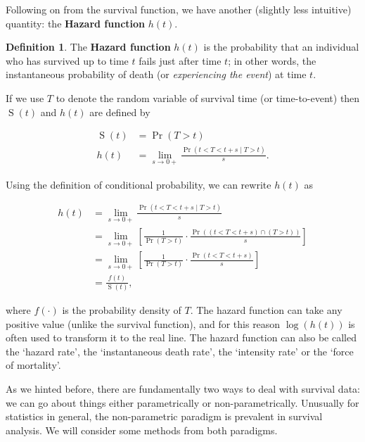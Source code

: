\documentclass[
  openany]{book}
\theoremstyle{definition}
\newtheorem{definition}{Definition}[chapter]
\theoremstyle{definition}
\theoremstyle{definition}
\theoremstyle{definition}
\theoremstyle{remark}
\begin{document}
Following on from the survival function, we have another (slightly less intuitive) quantity: the \textbf{Hazard function} \(h\left(t\right)\).

\begin{definition}
The \textbf{Hazard function} \(h(t)\) is the probability that an individual who has survived up to time \(t\) fails just after time \(t\); in other words, the instantaneous probability of death (or \emph{experiencing the event}) at time \(t\).
\end{definition}

If we use \(T\) to denote the random variable of survival time (or time-to-event) then \(\operatorname{S}\left(t\right)\) and \(h(t)\) are defined by

\begin{align*}
\operatorname{S}\left(t\right)&= \operatorname{Pr}\left(T>t\right)\\
h\left(t\right) & = \lim\limits_{s\rightarrow{0+}}\frac{\operatorname{Pr}\left(t<T<t+s\mid{T>t}\right)}{s}.
\end{align*}

Using the definition of conditional probability, we can rewrite \(h(t)\) as

\begin{align*}
h\left(t\right) & = \lim\limits_{s\rightarrow{0+}}\frac{\operatorname{Pr}\left(t<T<t+s\mid{T>t}\right)}{s} \\
 & = \lim\limits_{s\rightarrow{0+}}\left[\frac{1}{\operatorname{Pr}\left(T>t\right)}\cdot\frac{\operatorname{Pr}\left(\left(t<T<t+s\right)\cap\left(T>t\right)\right)}{s}\right] \\
 & = \lim\limits_{s\rightarrow{0+}}\left[\frac{1}{\operatorname{Pr}\left(T>t\right)}\cdot\frac{\operatorname{Pr}\left(t<T<t+s\right)}{s}\right]\\
 & = \frac{f\left(t\right)}{\operatorname{S}\left(t\right)},
\end{align*}

where \(f\left(\cdot\right)\) is the probability density of \(T\). The hazard function can take any positive value (unlike the survival function), and for this reason \(\log\left(h\left(t\right)\right)\) is often used to transform it to the real line. The hazard function can also be called the `hazard rate', the `instantaneous death rate', the `intensity rate' or the `force of mortality'.

As we hinted before, there are fundamentally two ways to deal with survival data: we can go about things either parametrically or non-parametrically. Unusually for statistics in general, the non-parametric paradigm is prevalent in survival analysis. We will consider some methods from both paradigms.
\end{document}
